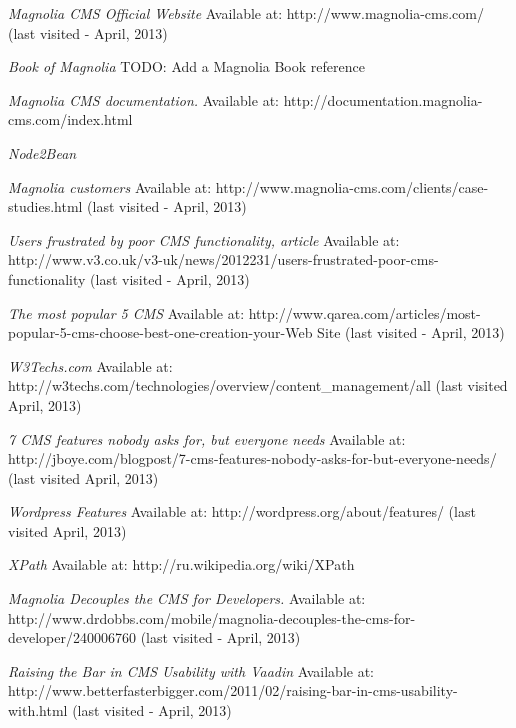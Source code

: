 \begin{thebibliography}{9}

\emph{Magnolia CMS Official Website}
Available at: http://www.magnolia-cms.com/ (last visited - April, 2013)

\emph{Book of Magnolia}
TODO: Add a Magnolia Book reference

\emph{Magnolia CMS documentation.} Available at: http://documentation.magnolia-cms.com/index.html
  
\emph{Node2Bean}

\emph{Magnolia customers} Available at: http://www.magnolia-cms.com/clients/case-studies.html (last visited - April, 2013)

\emph{Users frustrated by poor CMS functionality, article} 
Available at: http://www.v3.co.uk/v3-uk/news/2012231/users-frustrated-poor-cms-functionality (last visited - April, 2013)
  
\emph{The most popular 5 CMS} Available at: http://www.qarea.com/articles/most-popular-5-cms-choose-best-one-creation-your-Web Site (last visited - April, 2013)

\emph{W3Techs.com}
Available at: http://w3techs.com/technologies/overview/content_management/all (last visited April, 2013)

\emph{7 CMS features nobody asks for, but everyone needs}
Available at: http://jboye.com/blogpost/7-cms-features-nobody-asks-for-but-everyone-needs/ (last visited April, 2013)

\emph{Wordpress Features}
Available at: http://wordpress.org/about/features/ (last visited April, 2013)

\emph{XPath} Available at: http://ru.wikipedia.org/wiki/XPath

\emph{Magnolia Decouples the CMS for Developers.} Available at: http://www.drdobbs.com/mobile/magnolia-decouples-the-cms-for-developer/240006760 (last visited - April, 2013)
 
\emph{Raising the Bar in CMS Usability with Vaadin} 
Available at: http://www.betterfasterbigger.com/2011/02/raising-bar-in-cms-usability-with.html (last visited - April, 2013)
  

\end{thebibliography}
